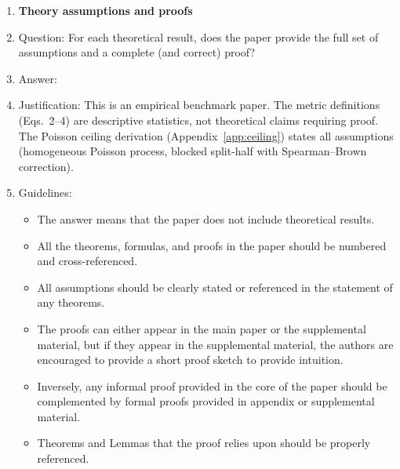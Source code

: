 \begin{enumerate}
\begin{itemize}
        \item If applicable, the authors should discuss possible limitations of their approach to address problems of privacy and fairness.
        \item While the authors might fear that complete honesty about limitations might be used by reviewers as grounds for rejection, a worse outcome might be that reviewers discover limitations that aren't acknowledged in the paper. The authors should use their best judgment and recognize that individual actions in favor of transparency play an important role in developing norms that preserve the integrity of the community. Reviewers will be specifically instructed to not penalize honesty concerning limitations.
    \end{itemize}

\item {\bf Theory assumptions and proofs}
    \item[] Question: For each theoretical result, does the paper provide the full set of assumptions and a complete (and correct) proof?
    \item[] Answer: \answerNA{}
    \item[] Justification: This is an empirical benchmark paper.  The
      metric definitions (Eqs.~2--4) are descriptive statistics,
      not theoretical claims requiring proof.  The Poisson ceiling
      derivation (Appendix~\ref{app:ceiling}) states all assumptions
      (homogeneous Poisson process, blocked split-half with
      Spearman--Brown correction).
    \item[] Guidelines:
    \begin{itemize}
        \item The answer \answerNA{} means that the paper does not include theoretical results. 
        \item All the theorems, formulas, and proofs in the paper should be numbered and cross-referenced.
        \item All assumptions should be clearly stated or referenced in the statement of any theorems.
        \item The proofs can either appear in the main paper or the supplemental material, but if they appear in the supplemental material, the authors are encouraged to provide a short proof sketch to provide intuition. 
        \item Inversely, any informal proof provided in the core of the paper should be complemented by formal proofs provided in appendix or supplemental material.
        \item Theorems and Lemmas that the proof relies upon should be properly referenced. 
    \end{itemize}


\end{enumerate}
